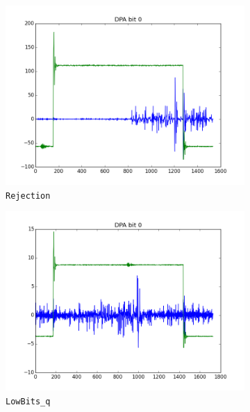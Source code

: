 \begin{figure}[h]
    \centering
    \begin{subfigure}[b]{0.3\textwidth}
        \includegraphics[width=\textwidth]{../figures/Rejection.png}
        \caption{\texttt{Rejection}}
        \label{fig:rejection}
    \end{subfigure}
    \hfill
    \begin{subfigure}[b]{0.3\textwidth}
        \includegraphics[width=\textwidth]{../figures/LowBits.png}
        \caption{\texttt{LowBits\_q}}
        \label{fig:lowbits}
    \end{subfigure}
    \hfill
    \begin{subfigure}[b]{0.3\textwidth}

\end{subfigure}
\end{figure}
